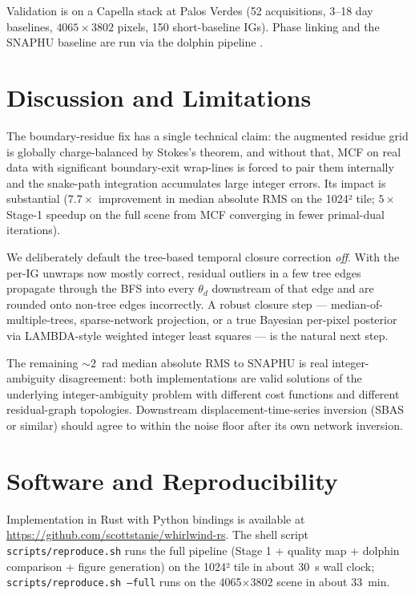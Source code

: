 \documentclass[journal]{IEEEtran}
\begin{document}
Validation is on a Capella stack at Palos Verdes (52 acquisitions,
3--18 day baselines, $4065\times 3802$ pixels, 150 short-baseline IGs).
Phase linking and the SNAPHU baseline are run via the dolphin pipeline
\cite{dolphin}.


\section{Discussion and Limitations}\label{sec:discussion}

The boundary-residue fix has a single technical claim: the augmented
residue grid is globally charge-balanced by Stokes's theorem, and
without that, MCF on real data with significant boundary-exit
wrap-lines is forced to pair them internally and the snake-path
integration accumulates large integer errors. Its impact is substantial
($7.7\times$ improvement in median absolute RMS on the 1024² tile;
$5\times$ Stage-1 speedup on the full scene from MCF converging in
fewer primal-dual iterations).

We deliberately default the tree-based temporal closure correction
\emph{off}. With the per-IG unwraps now mostly correct, residual
outliers in a few tree edges propagate through the BFS into every
$\theta_d$ downstream of that edge and are rounded onto non-tree edges
incorrectly. A robust closure step --- median-of-multiple-trees,
sparse-network projection, or a true Bayesian per-pixel posterior via
LAMBDA-style weighted integer least squares --- is the natural
next step.

The remaining $\sim 2$~rad median absolute RMS to SNAPHU is real
integer-ambiguity disagreement: both implementations are valid
solutions of the underlying integer-ambiguity problem with different
cost functions and different residual-graph topologies. Downstream
displacement-time-series inversion (SBAS or similar) should agree to
within the noise floor after its own network inversion.

\section*{Software and Reproducibility}

Implementation in Rust with Python bindings is available at
\url{https://github.com/scottstanie/whirlwind-rs}. The shell script
\texttt{scripts/reproduce.sh} runs the full pipeline (Stage 1 + quality
map + dolphin comparison + figure generation) on the 1024² tile in
about 30~s wall clock; \texttt{scripts/reproduce.sh~--full} runs on the
4065$\times$3802 scene in about 33~min.
\end{document}
